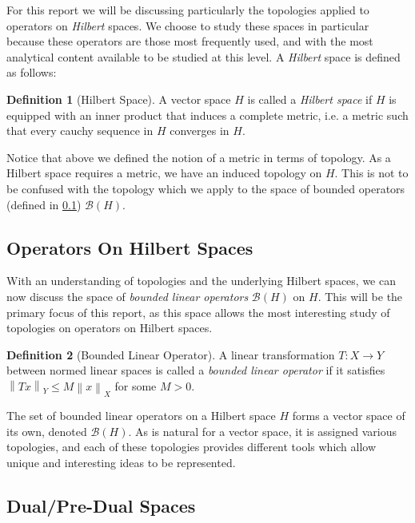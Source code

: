 \documentclass{article}
\theoremstyle{plain}
\theoremstyle{definition}
\newtheorem{definition}{Definition}
\newcommand{\norm}[1]{\left\lVert #1 \right\rVert}
\newcommand{\BH}{\cal{B}(H)}
\renewcommand{\cal}[1]{\mathcal{#1}}
\begin{document}
                For this report we will be discussing particularly the topologies applied to operators on \textit{Hilbert} spaces.
                We choose to study these spaces in particular because these operators are those most frequently used, and with the most analytical content available to be studied at this level.
                A \textit{Hilbert} space is defined as follows:
                \begin{definition}[Hilbert Space] \label{def:hilbert space}
                        A vector space $H$ is called a \textit{Hilbert space} if $H$ is equipped with an inner product that induces a complete metric, i.e. a metric such that every cauchy sequence in $H$ converges in $H$.
                \end{definition}
                Notice that above we defined the notion of a metric in terms of topology.
                As a Hilbert space requires a metric, we have an induced topology on $H$.
                This is not to be confused with the topology which we apply to the space of bounded operators (defined in \cref{subsec:operators}) $\BH$.
        
        \subsection{Operators On Hilbert Spaces} \label{subsec:operators}
                
                With an understanding of topologies and the underlying Hilbert spaces, we can now discuss the space of \textit{bounded linear operators} $\BH$ on $H$.
                This will be the primary focus of this report, as this space allows the most interesting study of topologies on operators on Hilbert spaces.
                \begin{definition}[Bounded Linear Operator] \label{def:BLO}
                        A linear transformation $T : X \to Y$ between normed linear spaces is called a \textit{bounded linear operator} if it satisfies $\norm{Tx}_Y \leq M \norm{x}_X$ for some $M > 0$.
                \end{definition}
                The set of bounded linear operators on a Hilbert space $H$ forms a vector space of its own, denoted $\BH$.
                As is natural for a vector space, it is assigned various topologies, and each of these topologies provides different tools which allow unique and interesting ideas to be represented.
        

        \subsection{Dual/Pre-Dual Spaces} \label{sec:dual}
\end{document}
